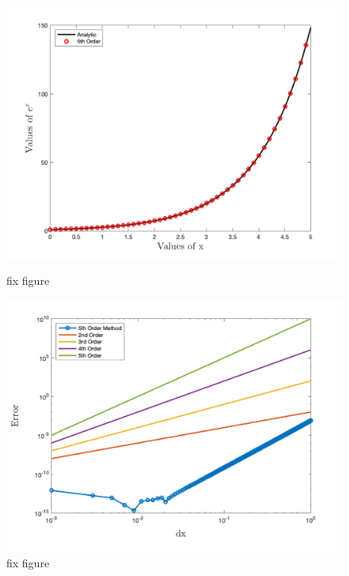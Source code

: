 \begin{figure}[htbp]
	\centering
	\begin{minipage}{.5\textwidth}
		\centering
		\includegraphics[width=1.0\linewidth]{figs/1stDer.png}
		\caption{fix figure}
		\label{fig:1stDer}
	\end{minipage}%
	\begin{minipage}{0.5\textwidth}
		\centering
		\includegraphics[width=1.0\linewidth]{figs/1stErr.png}
		\caption{fix figure}
		\label{fig:1stErr}
	\end{minipage}
\end{figure}

